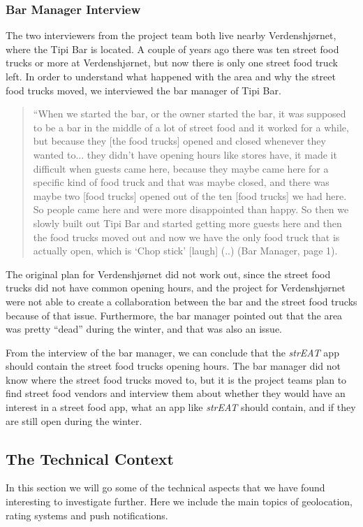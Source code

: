 \subsubsection{Bar Manager Interview}

The two interviewers from the project team both live nearby Verdenshjørnet, where the Tipi Bar is located. A couple of years ago there was ten street food trucks or more at Verdenshjørnet, but now there is only one street food truck left. In order to understand what happened with the area and why the street food trucks moved, we interviewed the bar manager of Tipi Bar.

\begin{quotation}
  “When we started the bar, or the owner started the bar, it was supposed to be a bar in the middle of a lot of street food and it worked for a while, but because they [the food trucks] opened and closed whenever they wanted to... they didn’t have opening hours like stores have, it made it difficult when guests came here, because they maybe came here for a specific kind of food truck and that was maybe closed, and there was maybe two [food trucks] opened out of the ten [food trucks] we had here. So people came here and were more disappointed than happy. So then we slowly built out Tipi Bar and started getting more guests here and then the food trucks moved out and now we have the only food truck that is actually open, which is ‘Chop stick’ [laugh] (..) (Bar Manager, page 1).
\end{quotation}


The original plan for Verdenshjørnet did not work out, since the street food trucks did not have common opening hours, and the project for Verdenshjørnet were not able to create a collaboration between the bar and the street food trucks because of that issue. Furthermore, the bar manager pointed out that the area was pretty “dead” during the winter, and that was also an issue.

From the interview of the bar manager, we can conclude that the \textit{strEAT} app should contain the street food trucks opening hours. The bar manager did not know where the street food trucks moved to, but it is the project teams plan to find street food vendors and interview them about whether they would have an interest in a street food app, what an app like \textit{strEAT} should contain, and if they are still open during the winter.

\subsection{The Technical Context}
In this section we will go some of the technical aspects that we have found interesting to investigate further. Here we include the main topics of geolocation, rating systems and push notifications.

